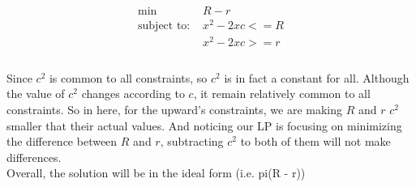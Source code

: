 \documentclass{article}
\begin{document}
\begin{align*}
    \text{min } & R - r \\
    \text{subject to: } & x^2 - 2xc <= R \\
                        & x^2 - 2xc >= r \\
\end{align*}
\\
Since $c^2$ is common to all constraints, so $c^2$ is in fact a constant for all. Although the value of $c^2$ changes according to $c$, 
it remain relatively common to all constraints. So in here, for the upward's constraints, we are making $R$ and $r$ $c^2$ smaller that their actual values.
And noticing our LP is focusing on minimizing the difference between $R$ and $r$, subtracting $c^2$ to both of them will not make differences. 
\\
Overall, the solution will be in the ideal form (i.e. pi(R - r))
\end{document}
